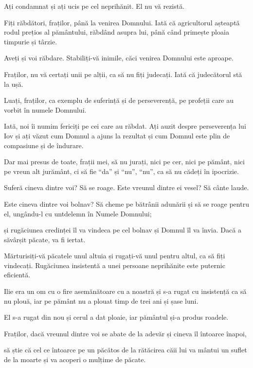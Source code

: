 {Ați condamnat și ați ucis pe cel neprihănit. El nu vă rezistă.


\par }{\PP {}Fiți răbdători, fraților, până la venirea Domnului. Iată că agricultorul așteaptă rodul prețios al pământului, răbdând asupra lui, până când primește ploaia timpurie și târzie.

Aveți și voi răbdare. Stabiliți-vă inimile, căci venirea Domnului este aproape.


\par }{\PP {}Fraților, nu vă certați unii pe alții, ca să nu fiți judecați. Iată că judecătorul stă la ușă.

Luați, fraților, ca exemplu de suferință și de perseverență, pe profeții care au vorbit în numele Domnului.

Iată, noi îi numim fericiți pe cei care au răbdat. Ați auzit despre perseverența lui Iov și ați văzut cum Domnul a ajuns la rezultat și cum Domnul este plin de compasiune și de îndurare.


\par }{\PP {}Dar mai presus de toate, frații mei, să nu jurați, nici pe cer, nici pe pământ, nici pe vreun alt jurământ, ci să fie “da” și “nu”, “nu”, ca să nu cădeți în ipocrizie.


\par }{\PP {}Suferă cineva dintre voi? Să se roage. Este vreunul dintre ei vesel? Să cânte laude.

Este cineva dintre voi bolnav? Să cheme pe bătrânii adunării și să se roage pentru el, ungându-l cu untdelemn în Numele Domnului;

și rugăciunea credinței îl va vindeca pe cel bolnav și Domnul îl va învia. Dacă a săvârșit păcate, va fi iertat.

Mărturisiți-vă păcatele unul altuia și rugați-vă unul pentru altul, ca să fiți vindecați. Rugăciunea insistentă a unei persoane neprihănite este puternic eficientă.

Ilie era un om cu o fire asemănătoare cu a noastră și s-a rugat cu insistență ca să nu plouă, iar pe pământ nu a plouat timp de trei ani și șase luni.

El s-a rugat din nou și cerul a dat ploaie, iar pământul și-a produs roadele.


\par }{\PP {}Fraților, dacă vreunul dintre voi se abate de la adevăr și cineva îl întoarce înapoi,

să știe că cel ce întoarce pe un păcătos de la rătăcirea căii lui va mântui un suflet de la moarte și va acoperi o mulțime de păcate.


\par }